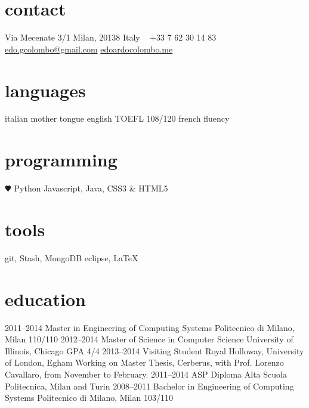 \documentclass[]{friggeri-cv} %
\begin{document}


\begin{aside} %
\section{contact}
Via Mecenate 3/1
Milan, 20138
Italy
~
+33 7 62 30 14 83
~
\href{mailto:edo.gcolombo@gmail.com}{edo.gcolombo@gmail.com}
\href{http://edoardocolombo.me}{edoardocolombo.me}
\section{languages}
italian mother tongue
english TOEFL 108/120
french fluency
\section{programming}
{\color{red} $\varheartsuit$} Python
Javascript, Java,
CSS3 \& HTML5
\section{tools}
git, Stash, MongoDB
eclipse, \LaTeX
\end{aside}


\section{education}

\begin{entrylist}
\entry
{2011--2014}
{Master {\normalfont in Engineering of Computing Systems}}
{Politecnico di Milano, Milan}
{110/110}
\entry
{2012--2014}
{Master of Science {\normalfont in Computer Science}}
{University of Illinois, Chicago}
{GPA 4/4}
\entry
{2013--2014}
{Visiting Student}
{Royal Holloway, University of London, Egham}
{Working on Master Thesis, Cerberus, with Prof. Lorenzo Cavallaro, from November to February.}
\entry
{2011--2014}
{ASP Diploma}
{Alta Scuola Politecnica, Milan and Turin}
{}
\entry
{2008--2011}
{Bachelor {\normalfont in Engineering of Computing Systems}}
{Politecnico di Milano, Milan}
{103/110}

\end{entrylist}
\end{document}
